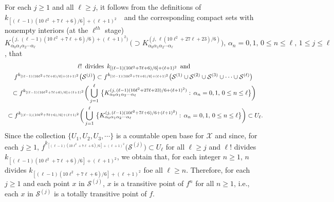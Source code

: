 \documentclass[12pt]{article}
\newcommand{\al}{\alpha}
\begin{document}
For each $j \ge 1$ and all $\ell \ge j$, it follows from the definitions of \,\, $k_{[(\ell-1)(10\ell^2+7\ell+6)/6]+(\ell+1)^2}$ \,\, and the corresponding compact sets with nonempty interiors (at the $\ell^{th}$ stage) $K_{\al_0\al_1\al_2\cdots\al_\ell}^{(j, \, (\ell-1)(10\ell^2+7\ell+6)/6)+(\ell+1)^2)} \, \big(\supset K_{\al_0\al_1\al_2\cdots\al_\ell}^{(j, \, \ell(10\ell^2+27\ell+23)/6)}\big), \, \al_n = 0, 1, \, 0 \le n \le \ell, \, 1 \le j \le \ell$, that
\begin{multline*}
$$
{\ell}! \,\,\, \text{divides} \,\,\, k_{[(\ell-1)(10\ell^2+7\ell+6)/6]+(\ell+1)^2} \,\,\, \text{and} \\ 
f^{k_{[(\ell-1)(10\ell^2+7\ell+6)/6]+(\ell+1)^2}}\big(\mathcal S^{(j)}\big) \subset f^{k_{[(\ell-1)(10\ell^2+7\ell+6)/6]+(\ell+1)^2}}\big(\mathcal S^{(1)} \cup \mathcal S^{(2)} \cup \mathcal S^{(3)} \cup \cdots \cup \mathcal S^{(\ell)} \big) \,\\
\, \subset f^{k_{[(\ell-1)(10\ell^2+7\ell+6)/6]+(\ell+1)^2}}\bigg(\bigcup_{j=1}^\ell \, \big\{ K_{\al_0\al_1\al_2\cdots\al_\ell}^{(j, \, (\ell-1)(10\ell^2+27\ell+23)/6+(\ell+1)^2)}: \, \al_n = 0, 1, \, 0 \le n \le \ell \big\}\bigg) \\
\,\,\, \subset f^{k_{[(\ell-1)(10\ell^2+7\ell+6)/6]+(\ell+1)^2}}\bigg(\bigcup_{j=1}^\ell \, \big\{ K_{\al_0\al_1\al_2\cdots\al_\ell}^{(j, \, (\ell-1)(10\ell^2+7\ell+6)/6+(\ell+1)^2)}: \, \al_n = 0, 1, \, 0 \le n \le \ell \big\}\bigg) \subset U_\ell.
$$  
\end{multline*}
\indent Since the collection $\{ U_1, U_2, U_3, \cdots \}$ is a countable open base for $\mathcal X$ and since, for each $j \ge 1$, $f^{k_{[(\ell-1)(10\ell^2+7\ell+6)/6]+(\ell+1)^2}}\big(\mathcal S^{(j)}\big) \subset U_\ell$ for all $\ell \ge j$ and ${\ell}!$ divides $k_{[(\ell-1)(10\ell^2+7\ell+6)/6]+(\ell+1)^2}$, we obtain that, for each integer $n \ge 1$, $n$ divides $k_{[(\ell-1)(10\ell^2+7\ell+6)/6]+(\ell+1)^2}$ foe all $\ell \ge n$.  Therefore, for each $j \ge 1$ and each point $x$ in $\mathcal S^{(j)}$, $x$ is a transitive point of $f^n$ for all $n \ge 1$, i.e., each $x$ in $\mathcal S^{(j)}$ is a totally transitive point of $f$.  
\end{document}
